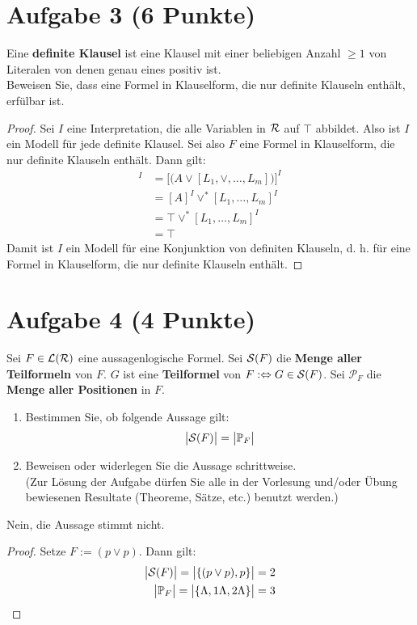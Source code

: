 \section*{Aufgabe 3 (6 Punkte)}
Eine \textbf{definite Klausel} ist eine Klausel mit einer beliebigen Anzahl $\geq1$ von Literalen von denen genau eines positiv ist.\\
Beweisen Sie, dass eine Formel in Klauselform, die nur definite Klauseln enthält, erfülbar ist.

\begin{proof}
	Sei $I$ eine Interpretation, die alle Variablen in $\RR$ auf $\top$ abbildet. 
	Also ist $I$ ein Modell für jede definite Klausel.
	Sei also $F$ eine Formel in Klauselform, die nur definite Klauseln enthält. Dann gilt:
	\begin{align*}
		[A,L_1,\ldots,L_m]^I
		&=\Big[\big(A\vee[L_1,\vee,\ldots,L_m]\big)\Big]^I\\
		&=[A]^I\vee^\ast[L_1,\ldots,L_m]^I\\
		&=\top\vee^\ast[L_1,\ldots,L_m]^I\\
		&=\top
	\end{align*}
	Damit ist $I$ ein Modell für eine Konjunktion von definiten Klauseln, d. h. für eine Formel in Klauselform, die nur definite Klauseln enthält.
\end{proof}

\section*{Aufgabe 4 (4 Punkte)}
Sei $F\in\L(\RR)$ eine aussagenlogische Formel. Sei $\S(F)$ die  \textbf{Menge aller Teilformeln} von $F$. 
$G$ ist eine \textbf{Teilformel} von $F:\gdw G\in \S(F)$. 
Sei $\mathcal{P}_F$ die \textbf{Menge aller Positionen} in $F$.
\begin{enumerate}
	\item Bestimmen Sie, ob folgende Aussage gilt:
	\begin{align*}
		\big|\S(F)\big|=\big|\P_F\big|
	\end{align*}
	\item Beweisen oder widerlegen Sie die Aussage schrittweise.\\
	(Zur Lösung der Aufgabe dürfen Sie alle in der Vorlesung und/oder Übung bewiesenen Resultate (Theoreme, Sätze, etc.) benutzt werden.)
\end{enumerate}

\begin{lösung}
	Nein, die Aussage stimmt nicht.
	\begin{proof}
		Setze $F:=(p\vee p)$. Dann gilt:
		\begin{align*}
			\big|\S(F)\big|=\big|\lbrace(p\vee p),p\rbrace\big|=2\\
			\big|\P_F\big|=\big|\lbrace\Lambda,1\Lambda,2\Lambda\rbrace\big|=3
		\end{align*}
	\end{proof}
\end{lösung}

